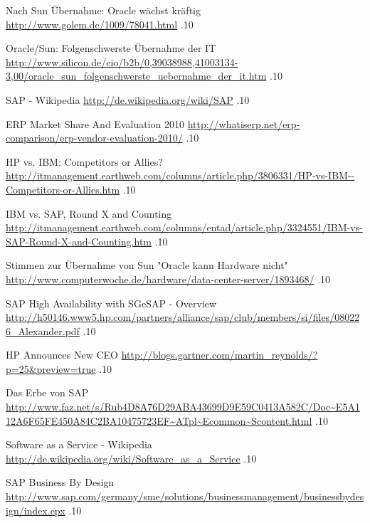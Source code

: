 \documentclass[a4paper,10pt,left=1.5cm,right=1.5cm,top=1.5cm,bottom=1.5cm]{article}
\begin{document}
\begin{thebibliography}{5}
  \newblock Nach Sun Übernahme: Oracle wächst kräftig 
  \newblock \url{http://www.golem.de/1009/78041.html}
  .10

  \newblock Oracle/Sun: Folgenschwerste Übernahme der IT
  \newblock \url{http://www.silicon.de/cio/b2b/0,39038988,41003134-3,00/oracle_sun_folgenschwerste_uebernahme_der_it.htm}
  .10

  \newblock SAP - Wikipedia
  \newblock \url{http://de.wikipedia.org/wiki/SAP}
  .10

  \newblock ERP Market Share And Evaluation 2010
  \newblock \url{http://whatiserp.net/erp-comparison/erp-vendor-evaluation-2010/}
  .10

  \newblock HP vs. IBM: Competitors or Allies?
  \newblock \url{http://itmanagement.earthweb.com/columns/article.php/3806331/HP-vs-IBM--Competitors-or-Allies.htm}
  .10

  \newblock IBM vs. SAP, Round X and Counting
  \newblock \url{http://itmanagement.earthweb.com/columns/entad/article.php/3324551/IBM-vs-SAP-Round-X-and-Counting.htm}
  .10

  \newblock Stimmen zur Übernahme von Sun "Oracle kann Hardware nicht"
  \newblock \url{http://www.computerwoche.de/hardware/data-center-server/1893468/}
  .10

  \newblock SAP High Availability with SGeSAP - Overview
  \newblock \url{http://h50146.www5.hp.com/partners/alliance/sap/club/members/si/files/080226_Alexander.pdf}
  .10

  \newblock HP Announces New CEO
  \newblock \url{http://blogs.gartner.com/martin_reynolds/?p=25&preview=true}
  .10

  \newblock Das Erbe von SAP
  \newblock \url{http://www.faz.net/s/Rub4D8A76D29ABA43699D9E59C0413A582C/Doc~E5A112A6F65FE450A84C2BA10475723EF~ATpl~Ecommon~Scontent.html}
  .10

  \newblock Software as a Service - Wikipedia
  \newblock \url{http://de.wikipedia.org/wiki/Software_as_a_Service}
  .10

  \newblock SAP Business By Design
  \newblock \url{http://www.sap.com/germany/sme/solutions/businessmanagement/businessbydesign/index.epx}
  .10
\end{thebibliography}
\end{document}
